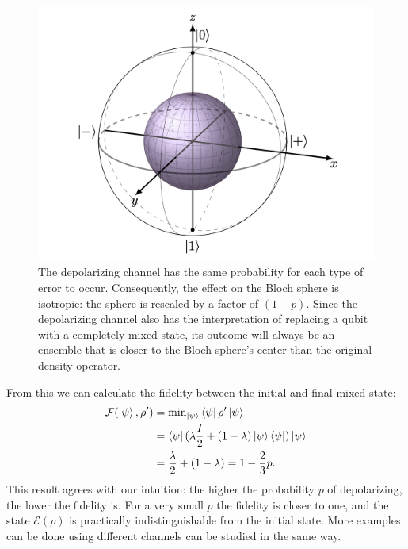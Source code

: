 \begin{figure}[h!]
    \centering
    \includegraphics[scale=0.5]{Mainmatter/images/Depolarizing_channel.png}
    \caption{
The depolarizing channel has the same probability for each type of error to occur. Consequently, the effect on the Bloch sphere is isotropic: the sphere is rescaled by a factor of $(1-p)$. Since the depolarizing channel also has the interpretation of replacing a qubit with a completely mixed state, its outcome will always be an ensemble that is closer to the Bloch sphere’s center than the original density operator.}
    \label{fig:depchannel}
\end{figure}
From this we can calculate the fidelity between the initial and final mixed state: 
\begin{align*}
    \mathcal{F}(\ket{\psi},\rho') &= \text{min}_{\ket{\psi}}  \bra{\psi}\rho'\ket{\psi} \\
    &= \bra{\psi}(\lambda \frac{I}{2}+(1-\lambda) \ket{\psi}\bra{\psi})\ket{\psi} \\
    &= \frac{\lambda}{2} + (1-\lambda) = 1-\frac{2}{3}p .
\end{align*}
This result agrees with our intuition: the higher the probability $p$ of depolarizing, the lower the fidelity is. For a very small $p$ the fidelity is closer to one, and the state $\mathcal{E}(\rho)$ is practically indistinguishable from the initial state. More examples can be done using different channels can be studied in the same way.


